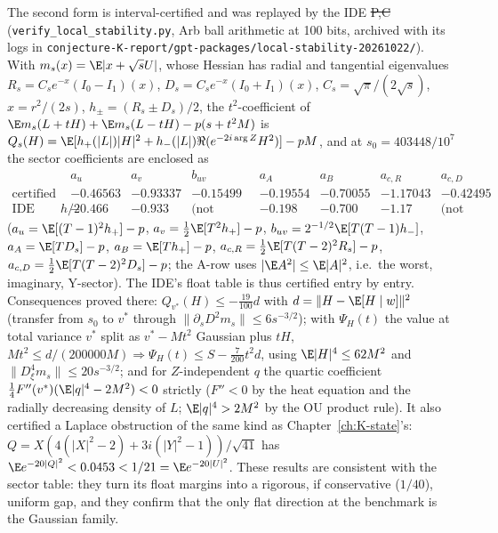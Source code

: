 The second form is interval-certified and was replayed by the IDE
\st{P,C} (\texttt{verify\_local\_stability.py}, Arb ball arithmetic at
100 bits, archived with its logs in
\texttt{conjecture-K-report/gpt-packages/local-stability-20261022/}).
With $m_s(x)=\E|x+\sqrt sU|$, whose Hessian has radial and tangential
eigenvalues $R_s=C_se^{-x}(I_0-I_1)(x)$, $D_s=C_se^{-x}(I_0+I_1)(x)$,
$C_s=\sqrt\pi/(2\sqrt s)$, $x=r^2/(2s)$, $h_\pm=(R_s\pm D_s)/2$, the
$t^2$-coefficient of $\E m_s(L+tH)+\E m_s(L-tH)-p(s+t^2M)$ is
$Q_s(H)=\E[h_+(|L|)|H|^2+h_-(|L|)\Re(e^{-2i\arg Z}H^2)]-pM$, and at
$s_0=403448/10^7$ the sector coefficients are enclosed as
\[
\begin{array}{c|ccccccc}
 &a_u&a_v&b_{uv}&a_A&a_B&a_{c,R}&a_{c,D}\\\hline
 \text{certified}&-0.46563&-0.93337&-0.15499&-0.19554&-0.70055&-1.17043&-0.42495\\
 \text{IDE float }h/2&-0.466&-0.933&\text{(not computed)}&-0.198&-0.700&-1.17&\text{(not computed)}
\end{array}
\]
($a_u=\E[(T-1)^2h_+]-p$, $a_v=\frac12\E[T^2h_+]-p$,
$b_{uv}=2^{-1/2}\E[T(T-1)h_-]$, $a_A=\E[TD_s]-p$, $a_B=\E[Th_+]-p$,
$a_{c,R}=\frac12\E[T(T-2)^2R_s]-p$, $a_{c,D}=\frac12\E[T(T-2)^2D_s]-p$;
the A-row uses $|\E A^2|\le\E|A|^2$, i.e.\ the worst, imaginary, Y-sector).
The IDE's float table is thus certified entry by entry. Consequences
proved there: $Q_{v^*}(H)\le-\frac{19}{100}d$ with
$d=\|H-\E[H\mid w]\|^2$ (transfer from $s_0$ to $v^*$ through
$\|\partial_sD^2m_s\|\le6s^{-3/2}$); with $\Psi_H(t)$ the value at total
variance $v^*$ split as $v^*-Mt^2$ Gaussian plus $tH$,
$Mt^2\le d/(200000M)\Rightarrow\Psi_H(t)\le S-\frac7{200}t^2d$, using
$\E|H|^4\le62M^2$ and $\|D^4_\xi m_s\|\le20s^{-3/2}$; and for
$Z$-independent $q$ the quartic coefficient
$\frac14F''(v^*)(\E|q|^4-2M^2)<0$ strictly ($F''<0$ by the heat
equation and the radially decreasing density of $L$; $\E|q|^4>2M^2$ by
the OU product rule). It also certified a Laplace obstruction of the
same kind as Chapter~\ref{ch:K-state}'s:
$Q=X(4(|X|^2-2)+3i(|Y|^2-1))/\sqrt{41}$ has
$\E e^{-20|Q|^2}<0.0453<1/21=\E e^{-20|U|^2}$. These results are consistent with the sector table: they
turn its float margins into a rigorous, if conservative ($1/40$),
uniform gap, and they confirm that the only flat direction at the
benchmark is the Gaussian family.
